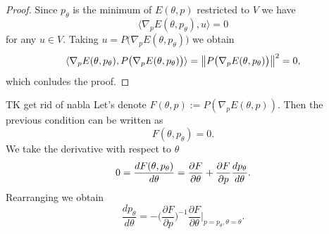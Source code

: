 \documentclass[a4paper,10pt]{report}
\begin{document}
\begin{proof}
  Since $p_\theta$ is the minimum of $E(\theta,p)$ restricted to $V$ we have \[\langle \nabla_p E(\theta,p_{\theta}), u \rangle = 0\] for any $u\in V$. Taking $u = P\big( \nabla_p E(\theta,p_\theta)\big)$ we obtain
  \[\langle \nabla_p E(\theta,p_{\theta}), P\big( \nabla_p E(\theta,p_\theta)\big) \rangle = \left\|P\big( \nabla_p E(\theta,p_\theta)\big)\right\|^2=0,\]
  which conludes the proof.
\end{proof}
TK get rid of nabla
Let's denote $F(\theta,p) :=P (\nabla_p E(\theta,p)).$ Then the previous condition can be written as
\begin{equation}
 F(\theta,p_\theta) = 0.
\end{equation}
We take the derivative with respect to $\theta$
\begin{equation}
0=\frac{dF(\theta, p_\theta)}{d \theta} = \frac{\partial F}{\partial \theta} + \frac{\partial F}{\partial p} \frac{dp_\theta}{d \theta}.
\end{equation}
Rearranging we obtain
\begin{equation}
 \frac{d p_\theta}{d\theta} = - \bigg(\frac{\partial F}{\partial p}\bigg)^{-1}  \frac{\partial F}{\partial \theta}\bigg|_{p=p_\theta, \theta=\theta}.
\end{equation}
\end{document}
